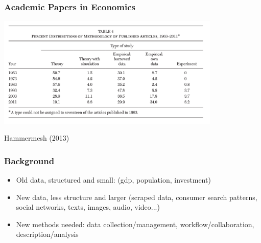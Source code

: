 \documentclass[compress, aspectratio=54]{beamer}
\begin{document}
\begin{frame}
\frametitle{Academic Papers in Economics}

\begin{center}
    \includegraphics[width=0.8\textwidth]{Figures/percent-distribution.png}
\end{center}
Hammermesh (2013)
\end{frame}
\begin{frame}
\frametitle{Background}
\begin{itemize}
\item Old data, structured and small: (gdp, population, investment)
\item New data, less structure and larger (scraped data, consumer search patterns, social networks, texts, images, audio, video...)
\item New methods needed: data collection/management, workflow/collaboration, description/analysis

\end{itemize}
\end{frame}
\end{document}
